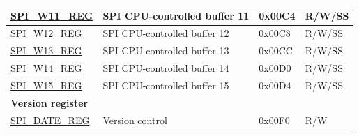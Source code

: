 \begin{longtable}{ | p{6cm} | p{7.2cm} | p{1.3cm} | p{1cm} | }
\hyperref[regdesc:SPIW11REG]{SPI\_W11\_REG} & SPI CPU-controlled buffer 11 & 0x00C4 & R/W/SS \\ \hline
\hyperref[regdesc:SPIW12REG]{SPI\_W12\_REG} & SPI CPU-controlled buffer 12 & 0x00C8 & R/W/SS \\ \hline
\hyperref[regdesc:SPIW13REG]{SPI\_W13\_REG} & SPI CPU-controlled buffer 13 & 0x00CC & R/W/SS \\ \hline
\hyperref[regdesc:SPIW14REG]{SPI\_W14\_REG} & SPI CPU-controlled buffer 14 & 0x00D0 & R/W/SS \\ \hline
\hyperref[regdesc:SPIW15REG]{SPI\_W15\_REG} & SPI CPU-controlled buffer 15 & 0x00D4 & R/W/SS \\ \hline
\multicolumn{4}{|l|}{\textbf{Version register}} \\ \hline
\hyperref[regdesc:SPIDATEREG]{SPI\_DATE\_REG} & Version control & 0x00F0 & R/W \\ \hline
\end{longtable}
